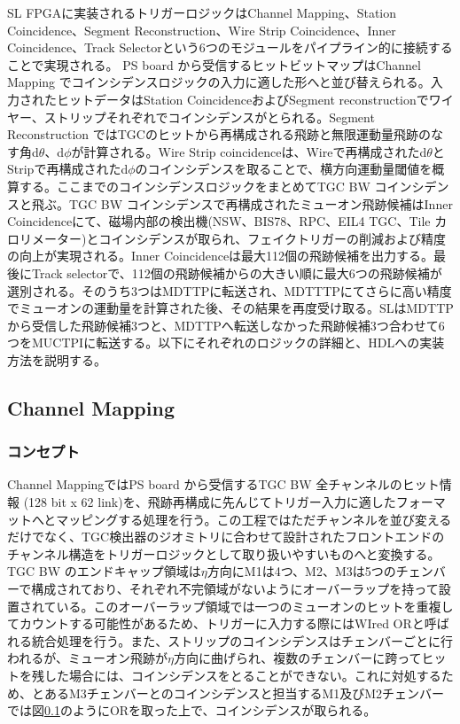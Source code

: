 SL FPGAに実装されるトリガーロジックはChannel Mapping、Station Coincidence、Segment Reconstruction、Wire Strip Coincidence、Inner Coincidence、Track Selectorという6つのモジュールをパイプライン的に接続することで実現される。
PS board から受信するヒットビットマップはChannel Mapping でコインシデンスロジックの入力に適した形へと並び替えられる。入力されたヒットデータはStation CoincidenceおよびSegment reconstructionでワイヤー、ストリップそれぞれでコインシデンスがとられる。Segment Reconstruction ではTGCのヒットから再構成される飛跡と無限運動量飛跡のなす角d$\theta$、d$\phi$が計算される。Wire Strip coincidenceは、Wireで再構成されたd$\theta$とStripで再構成されたd$\phi$のコインシデンスを取ることで、横方向運動量閾値\pt を概算する。ここまでのコインシデンスロジックをまとめてTGC BW コインシデンスと飛ぶ。TGC BW コインシデンスで再構成されたミューオン飛跡候補はInner Coincidenceにて、磁場内部の検出機(NSW、BIS78、RPC、EIL4 TGC、Tile カロリメーター)とコインシデンスが取られ、フェイクトリガーの削減および\pt 精度の向上が実現される。Inner Coincidenceは最大112個の飛跡候補を出力する。最後にTrack selectorで、112個の飛跡候補から\pt の大きい順に最大6つの飛跡候補が選別される。そのうち3つはMDTTPに転送され、MDTTTPにてさらに高い精度でミューオンの運動量を計算された後、その結果を再度受け取る。SLはMDTTPから受信した飛跡候補3つと、MDTTPへ転送しなかった飛跡候補3つ合わせて6つをMUCTPIに転送する。以下にそれぞれのロジックの詳細と、HDLへの実装方法を説明する。

\subsection{Channel Mapping}
\subsubsection*{コンセプト}
Channel MappingではPS board から受信するTGC BW 全チャンネルのヒット情報 (128 bit x 62 link)を、飛跡再構成に先んじてトリガー入力に適したフォーマットへとマッピングする処理を行う。この工程ではただチャンネルを並び変えるだけでなく、TGC検出器のジオミトリに合わせて設計されたフロントエンドのチャンネル構造をトリガーロジックとして取り扱いやすいものへと変換する。TGC BW のエンドキャップ領域は$\eta$方向にM1は4つ、M2、M3は5つのチェンバーで構成されており、それぞれ不完領域がないようにオーバーラップを持って設置されている。このオーバーラップ領域では一つのミューオンのヒットを重複してカウントする可能性があるため、トリガーに入力する際にはWIred ORと呼ばれる統合処理を行う。また、ストリップのコインシデンスはチェンバーごとに行われるが、ミューオン飛跡が$\eta$方向に曲げられ、複数のチェンバーに跨ってヒットを残した場合には、コインシデンスをとることができない。これに対処するため、とあるM3チェンバーとのコインシデンスと担当するM1及びM2チェンバーでは図\ref{}のようにORを取った上で、コインシデンスが取られる。

